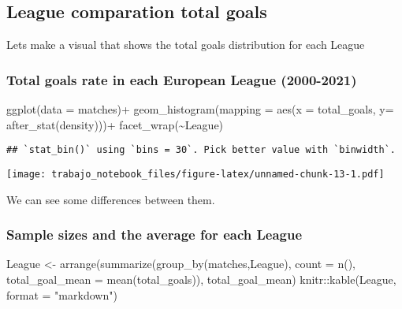 \documentclass[
]{article}
\newenvironment{Shaded}{\begin{snugshade}}{\end{snugshade}}
\newcommand{\AttributeTok}[1]{\textcolor[rgb]{0.77,0.63,0.00}{#1}}
\newcommand{\FunctionTok}[1]{\textcolor[rgb]{0.00,0.00,0.00}{#1}}
\newcommand{\NormalTok}[1]{#1}
\newcommand{\OtherTok}[1]{\textcolor[rgb]{0.56,0.35,0.01}{#1}}
\newcommand{\SpecialCharTok}[1]{\textcolor[rgb]{0.00,0.00,0.00}{#1}}
\newcommand{\StringTok}[1]{\textcolor[rgb]{0.31,0.60,0.02}{#1}}
\begin{document}
\hypertarget{league-comparation-total-goals}{%
\subsection{League comparation total
goals}\label{league-comparation-total-goals}}

Lets make a visual that shows the total goals distribution for each
League

\hypertarget{total-goals-rate-in-each-european-league-2000-2021}{%
\subsubsection{Total goals rate in each European League
(2000-2021)}\label{total-goals-rate-in-each-european-league-2000-2021}}

\begin{Shaded}
\begin{Highlighting}[]
\FunctionTok{ggplot}\NormalTok{(}\AttributeTok{data =}\NormalTok{ matches)}\SpecialCharTok{+}
  \FunctionTok{geom\_histogram}\NormalTok{(}\AttributeTok{mapping =} \FunctionTok{aes}\NormalTok{(}\AttributeTok{x =}\NormalTok{ total\_goals, }\AttributeTok{y=} \FunctionTok{after\_stat}\NormalTok{(density)))}\SpecialCharTok{+}
  \FunctionTok{facet\_wrap}\NormalTok{(}\SpecialCharTok{\textasciitilde{}}\NormalTok{League)}
\end{Highlighting}
\end{Shaded}

\begin{verbatim}
## `stat_bin()` using `bins = 30`. Pick better value with `binwidth`.
\end{verbatim}

\texttt{[image: trabajo\_notebook\_files/figure-latex/unnamed-chunk-13-1.pdf]}

We can see some differences between them.

\hypertarget{sample-sizes-and-the-average-for-each-league}{%
\subsubsection{Sample sizes and the average for each
League}\label{sample-sizes-and-the-average-for-each-league}}

\begin{Shaded}
\begin{Highlighting}[]
\NormalTok{League }\OtherTok{\textless{}{-}} \FunctionTok{arrange}\NormalTok{(}\FunctionTok{summarize}\NormalTok{(}\FunctionTok{group\_by}\NormalTok{(matches,League), }\AttributeTok{count =} \FunctionTok{n}\NormalTok{(), }\AttributeTok{total\_goal\_mean =} \FunctionTok{mean}\NormalTok{(total\_goals)), total\_goal\_mean)}
\NormalTok{knitr}\SpecialCharTok{::}\FunctionTok{kable}\NormalTok{(League, }\AttributeTok{format =} \StringTok{"markdown"}\NormalTok{)}
\end{Highlighting}
\end{Shaded}
\end{document}
